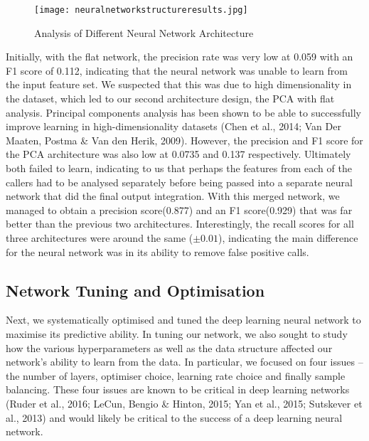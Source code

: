 \documentclass{article}
\begin{document}
\begin{figure}[H]
\texttt{[image: neuralnetworkstructureresults.jpg]}
\centering
\caption{Analysis of Different Neural Network Architecture}
\end{figure}
Initially, with the flat network, the precision rate was very low at 0.059 with an F1 score of 0.112, indicating that the neural network was unable to learn from the input feature set. We suspected that this was due to high dimensionality in the dataset, which led to our second architecture design, the PCA with flat analysis. Principal components analysis has been shown to be able to successfully improve learning in high-dimensionality datasets (Chen et al., 2014; Van Der Maaten, Postma \& Van den Herik, 2009). However, the precision and F1 score for the PCA architecture was also low at 0.0735 and 0.137 respectively. Ultimately both failed to learn, indicating to us that perhaps the features from each of the callers had to be analysed separately before being passed into a separate neural network that did the final output integration. With this merged network, we managed to obtain a precision score(0.877) and an F1 score(0.929) that was far better than the previous two architectures. Interestingly, the recall scores for all three architectures were around the same ($\pm 0.01$), indicating the main difference for the neural network was in its ability to remove false positive calls.

\subsection{Network Tuning and Optimisation}
Next, we systematically optimised and tuned the deep learning neural network to maximise its predictive ability. In tuning our network, we also sought to study how the various hyperparameters as well as the data structure affected our network's ability to learn from the data. In particular, we focused on four issues -- the number of layers, optimiser choice, learning rate choice and finally sample balancing. These four issues are known to be critical in deep learning networks (Ruder et al., 2016; LeCun, Bengio \& Hinton, 2015; Yan et al., 2015;  Sutskever et al., 2013) and would likely be critical to the success of a deep learning neural network.\\\\
\end{document}
